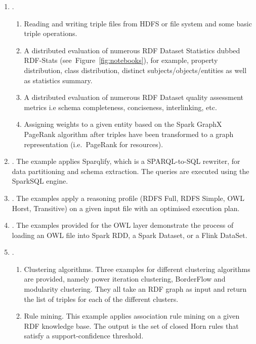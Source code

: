 \begin{enumerate}
    \item {}.
    \begin{enumerate}
      \item Reading and writing triple files from \gls{HDFS} or file system and some basic triple operations.
      \item A distributed evaluation of numerous \gls{RDF} Dataset Statistics dubbed RDF-Stats (see~Figure~\ref{fig:notebooks}), for example, property distribution, class distribution, distinct subjects/objects/entities as well as statistics summary.
      \item A distributed evaluation of numerous \gls{RDF} Dataset quality assessment metrics i.e schema completeness, conciseness, interlinking, etc.
      \item Assigning weights to a given entity based on the Spark GraphX PageRank algorithm after triples have been transformed to a graph representation (i.e.~PageRank for resources).
    \end{enumerate}
    \item {}. 
    The example applies Sparqlify, which is a SPARQL-to-SQL rewriter, for data partitioning and schema extraction. The queries are executed using the SparkSQL engine.
    \item {}. The examples apply a reasoning profile (\gls{RDFS} Full, \gls{RDFS} Simple, \gls{OWL} Horst, Transitive) on a given input file with an optimised execution plan.
    \item {}. The examples provided for the OWL layer demonstrate the process of loading an \gls{OWL} file into Spark \gls{RDD}, a Spark Dataset, or a Flink DataSet.
    \item {}.
    \begin{enumerate}
        \item Clustering algorithms. Three examples for different clustering algorithms are provided, namely power iteration clustering, BorderFlow and modularity clustering. 
        They all take an \gls{RDF} graph as input and return the list of triples for each of the different clusters.
        \item Rule mining. This example applies association rule mining on a given RDF knowledge base. The output is the set of closed Horn rules that satisfy a support-confidence threshold.
    \end{enumerate}
\end{enumerate}

